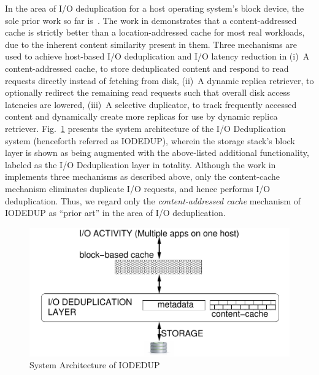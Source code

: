 In the area of I/O deduplication for a host operating system's block
device, the sole prior work so far is~\cite{iodedup}.
The work in \cite{iodedup} demonstrates that a content-addressed cache is
strictly better than a location-addressed cache for most real workloads, due to
the inherent content similarity present in them.
Three mechanisms are used to achieve 
host-based I/O deduplication
and I/O latency reduction in \cite{iodedup}\textemdash{}(i)~A
content-addressed cache, to store deduplicated content and respond to read
requests directly instead of fetching from disk,
(ii)~A dynamic replica retriever, to optionally
redirect the remaining read requests such that overall disk access
latencies are lowered, (iii)~A selective duplicator, to track frequently
accessed content and dynamically create more replicas for use
by dynamic replica retriever.
Fig.~\ref{fig:iodedup-arch}
presents the system architecture of the I/O Deduplication system
(henceforth referred as IODEDUP), wherein
the storage stack's block layer is shown as being augmented with the
above-listed additional functionality, 
labeled as the I/O Deduplication layer in totality.
Although the work in \cite{iodedup} implements three mechanisms as
described above, only the content-cache mechanism eliminates duplicate
I/O requests, and hence performs I/O deduplication.
Thus, we regard only the \textit{content-addressed cache} 
mechanism of IODEDUP as ``prior art'' in the area of I/O 
deduplication.

\begin{figure}[t]
\centering
\includegraphics[scale=0.65]{confided-figures/main/sys-arch-iodedup-host.pdf}
\vspace{-0.15in}
\caption{System Architecture of IODEDUP}
\label{fig:iodedup-arch}
\end{figure}

